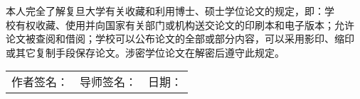 \vspace{42pt}

\begin{spacing}{1.5}
本人完全了解复旦大学有关收藏和利用博士、硕士学位论文的规定，即：学\\
校有权收藏、使用并向国家有关部门或机构送交论文的印刷本和电子版本；允许\\
论文被查阅和借阅；学校可以公布论文的全部或部分内容，可以采用影印、缩印\\
或其它复制手段保存论文。涉密学位论文在解密后遵守此规定。
\end{spacing}

%

 \vspace{14pt}
 {\hfill
 \begin{tabular}{lll}\\
  作者签名：\underline{\hspace{2.8cm}} & 导师签名：\underline{\hspace{2.8cm}} & 日期：\underline{\hspace{2cm}}
 \end{tabular}\par}



 \begin{center}
 \begin{tabular}{ll}\\

 \end{tabular}
 \end{center}
